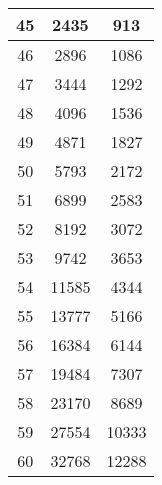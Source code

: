 \begin{figure}[h!]
\begin{tabular}{|c|c|c|}
        45           & 2435          & 913    \\\hline
        46           & 2896          & 1086   \\\hline
        47           & 3444          & 1292   \\\hline
        48           & 4096          & 1536   \\\hline
        49           & 4871          & 1827   \\\hline
        50           & 5793          & 2172   \\\hline
        51           & 6899          & 2583   \\\hline
        52           & 8192          & 3072   \\\hline
        53           & 9742          & 3653   \\\hline
        54           & 11585         & 4344   \\\hline
        55           & 13777         & 5166   \\\hline
        56           & 16384         & 6144   \\\hline
        57           & 19484         & 7307   \\\hline
        58           & 23170         & 8689   \\\hline
        59           & 27554         & 10333  \\\hline
        60           & 32768         & 12288  \\\hline
    \end{tabular}
\end{figure}
